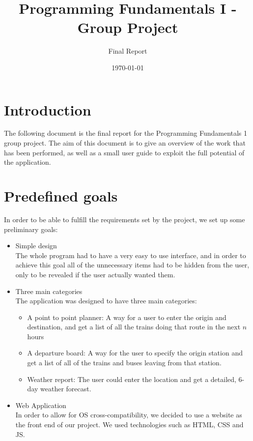 \documentclass[a4paper]{article}
\title{Programming Fundamentals I - Group Project}
\author{Final Report}
\date{\today}
\begin{document}
\maketitle
\section{Introduction}
The following document is the final report for the Programming Fundamentals 1 group project. The aim of this document is to give an overview of the work that has been performed, as well as a small user guide to exploit the full potential of the application.

\section{Predefined goals}
In order to be able to fulfill the requirements set by the project, we set up some preliminary goals:
\begin{itemize}
\item Simple design\\
The whole program had to have a very easy to use interface, and in order to achieve this goal all of the unnecessary items had to be hidden from the user, only to be revealed if the user actually wanted them.

\item Three main categories\\
The application was designed to have three main categories:
\begin{itemize}
\item A point to point planner: A way for a user to enter the origin and destination, and get a list of all the trains doing that route in the next $n$ hours
\item A departure board: A way for the user to specify the origin station and get a list of all of the trains and buses leaving from that station.
\item Weather report: The user could enter the location and get a detailed, 6-day weather forecast. 
\end{itemize}
\item Web Application\\
In order to allow for OS cross-compatibility, we decided to use a website as the front end of our project. We used technologies such as HTML, CSS and JS.
\end{itemize}
\end{document}
